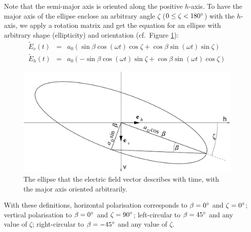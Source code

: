 Note that the semi-major axis is oriented along the positive $h$-axis.
To have the major axis of the ellipse enclose an arbitrary angle
$\zeta$ ($0 \leq \zeta < 180^\circ$) with the $h$-axis, we apply a
rotation matrix and get the equation for an ellipse with arbitrary
shape (ellipticity) and orientation (cf.\
Figure \ref{fig:polarization:ellipse_arbitrary})\label{def:orientation-angle}:
\begin{eqnarray}
  \label{eq:polarization:ellipse_rotated1}
 \tilde{E}_v (t) &=&  a_0(  \sin\beta \cos(\omega t) \cos\zeta
                           +\cos\beta \sin(\omega t) \sin\zeta )\\
  \label{eq:polarization:ellipse_rotated2}
 \tilde{E}_h (t) &=&  a_0( -\sin\beta \cos(\omega t) \sin\zeta
                           +\cos\beta \sin(\omega t) \cos\zeta )
\end{eqnarray}
%
\begin{figure}
 \begin{center}
  \begin{minipage}[c]{0.9\textwidth}
   \begin{center}
    \includegraphics*[width=0.9\hsize]{pol_ellipse_arbitrary}
   \end{center}
  \end{minipage}
  \begin{minipage}[c]{0.9\textwidth}
   \caption{The ellipse that the electric field vector describes with
     time, with the major axis oriented arbitrarily.}
   \label{fig:polarization:ellipse_arbitrary}
  \end{minipage}
 \end{center}
\end{figure}   
With these definitions, horizontal polarisation corresponds to
$\beta=0^\circ$ and $\zeta=0^\circ$; vertical polarisation to 
$\beta=0^\circ$ and $\zeta=90^\circ$; left-circular to 
$\beta=45^\circ$ and any value of $\zeta$; right-circular to 
$\beta=-45^\circ$ and any value of $\zeta$.
    

